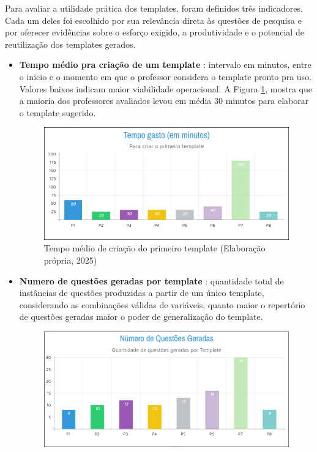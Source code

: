 Para avaliar a utilidade prática dos templates, foram definidos três indicadores. Cada um deles foi escolhido por sua relevância direta às questões de pesquisa e por oferecer evidências sobre o esforço exigido, a produtividade e o potencial de reutilização dos templates gerados.
    \begin{itemize}
        \item \textbf{Tempo médio pra criação de um template} : intervalo em minutos, entre o inicio e o momento em que o professor considera o template pronto pra uso. Valores baixos indicam maior viabilidade operacional. A Figura \ref{fig:tempo-gasto}, mostra que a maioria dos professores avaliados levou em média 30 minutos para elaborar o template sugerido.
\begin{figure}[ht]
	\centering
	\includegraphics[width=16cm]{./imagens/capitulo8/tempo-gasto}
	\caption{Tempo médio de criação do primeiro template (Elaboração própria, 2025) }
	\label{fig:tempo-gasto}
\end{figure}
        \item \textbf{Numero de questões geradas por template} : quantidade total de instâncias de questões produzidas a partir de um único template, considerando as combinações válidas de variáveis, quanto maior o repertório de questões geradas maior o poder de generalização do template.
\begin{figure}[ht]
	\centering
	\includegraphics[width=16cm]{./imagens/capitulo8/questoes-geradas}

\end{figure}
\end{itemize}
